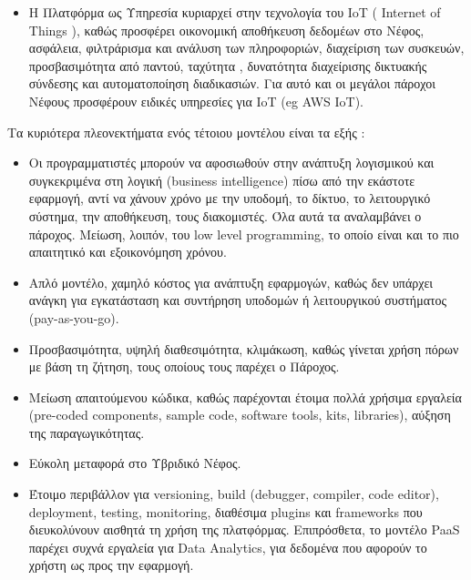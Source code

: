 \documentclass{article}
\begin{document}
\begin{itemize}
\item Η Πλατφόρμα ως Υπηρεσία κυριαρχεί στην τεχνολογία του IoT ( Internet of Things ), καθώς προσφέρει οικονομική αποθήκευση δεδομέων στο Νέφος, ασφάλεια, φιλτράρισμα και ανάλυση των πληροφοριών, διαχείριση των συσκευών, προσβασιμότητα από παντού, ταχύτητα , δυνατότητα διαχείρισης δικτυακής σύνδεσης και αυτοματοποίηση διαδικασιών. Για αυτό και οι μεγάλοι πάροχοι Νέφους προσφέρουν ειδικές υπηρεσίες για IoT (eg AWS IoT).
\end{itemize}
Τα κυριότερα πλεονεκτήματα ενός τέτοιου μοντέλου είναι τα εξής :
\begin{itemize}
\item Οι προγραμματιστές μπορούν να αφοσιωθούν στην ανάπτυξη λογισμικού και συγκεκριμένα στη λογική (business intelligence) πίσω από την εκάστοτε εφαρμογή, αντί να χάνουν χρόνο με την υποδομή, το δίκτυο, το λειτουργικό σύστημα, την αποθήκευση, τους διακομιστές. Όλα αυτά τα αναλαμβάνει ο πάροχος. Μείωση, λοιπόν, του low level  programming, το οποίο είναι και το πιο απαιτητικό και εξοικονόμηση χρόνου.
\item Απλό μοντέλο, χαμηλό κόστος για ανάπτυξη εφαρμογών, καθώς δεν υπάρχει ανάγκη για εγκατάσταση και συντήρηση υποδομών ή λειτουργικού συστήματος  (pay-as-you-go).
\item Προσβασιμότητα, υψηλή διαθεσιμότητα, κλιμάκωση, καθώς γίνεται χρήση πόρων με βάση τη ζήτηση, τους οποίους τους παρέχει ο Πάροχος.
\item Μείωση απαιτούμενου κώδικα, καθώς παρέχονται έτοιμα πολλά χρήσιμα εργαλεία (pre-coded components, sample code, software tools, kits, libraries), αύξηση της παραγωγικότητας.
\item Εύκολη μεταφορά στο Υβριδικό Νέφος.
\item Έτοιμο περιβάλλον για versioning, build (debugger, compiler, code editor), deployment, testing, monitoring, διαθέσιμα plugins και frameworks που διευκολύνουν αισθητά τη χρήση της πλατφόρμας. Επιπρόσθετα,  το μοντέλο PaaS παρέχει συχνά εργαλεία για Data Analytics, για δεδομένα που αφορούν το χρήστη ως προς την εφαρμογή.

\end{itemize}
\end{document}
